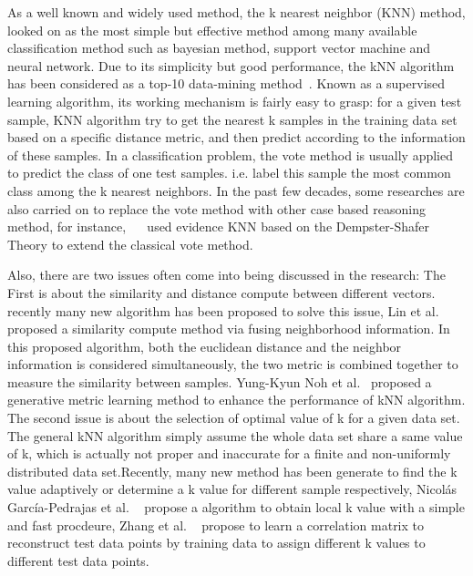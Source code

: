 \documentclass[runningheads]{llncs}
\begin{document}
As a well known and widely used method, the k nearest neighbor (KNN) method, looked on as the most simple but effective method among many available classification method such as bayesian method, support vector machine and neural network. Due to its simplicity but good performance, the kNN algorithm has been considered as a top-10 data-mining method~\cite{ref_article2}. Known as a supervised learning algorithm, its working mechanism is fairly easy to grasp: for a given test sample, KNN algorithm try to get the nearest k samples in the training data set based on a specific distance metric, and then predict according to the information of these samples. In a classification problem, the vote method is usually applied to predict the class of one test samples. i.e. label this sample the most common class among the k nearest neighbors. In the past few decades, some researches are also carried on to replace the vote method with other case based reasoning method, for instance, ~\cite{ref_article3}~\cite{ref_article4} used evidence KNN based on the Dempster-Shafer Theory to extend the classical vote method.

Also, there are two issues often come into being discussed in the research: The First is about the similarity and distance compute between different vectors. recently many new algorithm has been proposed to solve this issue, Lin et al. ~\cite{ref_article5} proposed a similarity compute method via fusing neighborhood information. In this proposed algorithm, both the euclidean distance and the neighbor information is considered simultaneously, the two metric is combined together to measure the similarity between samples. Yung-Kyun Noh et al.~\cite{ref_article6} proposed a generative metric learning method to enhance the performance of kNN algorithm. The second issue is about the selection of optimal value of k for a given data set. The general kNN algorithm simply  assume the whole data set share a same value of k, which is actually not proper and inaccurate for a finite and non-uniformly distributed data set.Recently, many new method has been generate to find the k value adaptively or determine a k value for different sample respectively,  Nicolás García-Pedrajas et al. ~\cite{ref_article7} propose a algorithm to obtain local k value with a simple and fast procdeure, Zhang et al. ~\cite{ref_article8} propose to learn a correlation matrix to reconstruct test data points by training data to assign different k values to different test data points.
\end{document}
